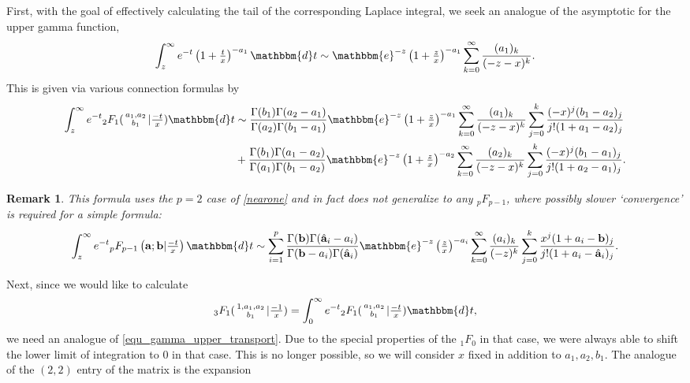 \documentclass[12pt]{article}
\newcommand{\ee}[0] {\mathbbm{e}}
\newcommand{\dd}[0] {\mathbbm{d}}
\numberwithin{equation}{section}
\newtheorem{remark}[theorem]{Remark}
\newcommand{\FFs}[6] {{}_{#1}{#2}_{#3} ( \begin{smallmatrix} #4 \\ #5 \end{smallmatrix} | {#6}  )}
\newcommand{\FFf}[5] {{}_{#1}{#2}_{#3} \left(#4 | {#5} \right)}
\newcommand{\bfa}[0] {\mathbf{a}}
\newcommand{\bfb}[0] {\mathbf{b}}
\begin{document}
First, with the goal of effectively calculating the tail of the corresponding Laplace integral, we seek an analogue of the asymptotic for the upper gamma function,
\begin{equation*}
\int_{z}^{\infty} e^{-t} \left(1+\tfrac{t}{x}\right)^{-a_1} \dd t \sim \ee^{-z} \left(1+\tfrac{z}{x}\right)^{-a_1} \sum_{k=0}^{\infty} \frac{(a_1)_k}{(-z-x)^k} \text{.}
\end{equation*}
This is given via various connection formulas by
\begin{equation}
\label{equ_3f1_int_tail}
\begin{alignedat}{3}
\int_{z}^{\infty} e^{-t} \FFs{2}{F}{1}{a_1,a_2}{b_1}{\tfrac{-t}{x}} \dd t &\sim \frac{\Gamma(b_1)\Gamma(a_2-a_1)}{\Gamma(a_2)\Gamma(b_1-a_1)}\ee^{-z} \left(1+\tfrac{z}{x}\right)^{-a_1} \sum_{k=0}^{\infty} \frac{(a_1)_k}{(-z-x)^k} \sum_{j=0}^{k} \frac{(-x)^j(b_1-a_2)_j}{j!(1+a_1-a_2)_j}\\
&+\frac{\Gamma(b_1)\Gamma(a_1-a_2)}{\Gamma(a_1)\Gamma(b_1-a_2)}\ee^{-z} \left(1+\tfrac{z}{x}\right)^{-a_2} \sum_{k=0}^{\infty} \frac{(a_2)_k}{(-z-x)^k} \sum_{j=0}^{k} \frac{(-x)^j(b_1-a_1)_j}{j!(1+a_2-a_1)_j} \text{.}
\end{alignedat}
\end{equation}
\begin{remark}
This formula uses the $p=2$ case of \eqref{nearone} and in fact does not generalize to any ${}_p F_{p-1}$, where possibly slower `convergence' is required for a simple formula:
\begin{equation*}
\int_{z}^{\infty} e^{-t} \FFf{p}{F}{p-1}{\bfa; \bfb}{\tfrac{-t}{x}}  \dd t \sim \sum_{i=1}^{p} \frac{\Gamma(\mathbf{b}) \Gamma(\hat{\mathbf{a}}_i-a_i)}{\Gamma(\mathbf{b}-a_i) \Gamma(\hat{\mathbf{a}}_i)} \ee^{-z} \left(\tfrac{z}{x}\right)^{-a_i} \sum_{k=0}^{\infty} \frac{(a_i)_k}{(-z)^k} \sum_{j=0}^{k} \frac{x^j(1+a_i-\mathbf{b})_j}{j!(1+a_i-\hat{\mathbf{a}}_i)_j}\text{.}
\end{equation*}
\end{remark}
Next, since we would like to calculate
\begin{equation*}
\FFs{3}{F}{1}{1,a_1,a_2}{b_1}{\tfrac{-1}{x}} = \int_{0}^{\infty} e^{-t} \FFs{2}{F}{1}{a_1,a_2}{b_1}{\tfrac{-t}{x}} \dd t\text{,}
\end{equation*}
we need an analogue of \eqref{equ_gamma_upper_transport}. Due to the special properties of the ${}_1 F_{0}$ in that case, we were always able to shift the lower limit of integration to $0$ in that case. This is no longer possible, so we will consider $x$ fixed in addition to $a_1,a_2,b_1$. The analogue of the $(2,2)$ entry of the matrix is the expansion
\end{document}
